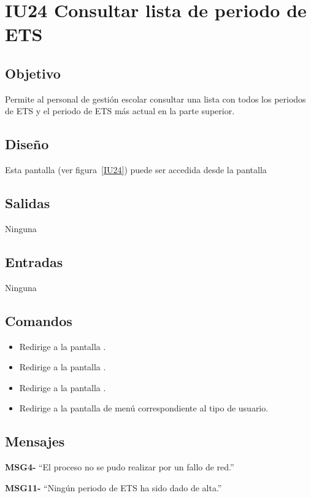 
\section{IU24 Consultar lista de periodo de ETS}
\subsection{Objetivo}
   Permite al personal de gestión escolar consultar una lista con todos los periodos de ETS y el periodo de ETS más actual en la parte superior.
\subsection{Diseño}
    Esta pantalla  (ver figura~\ref{IU24}) puede ser accedida desde la pantalla 

\subsection{Salidas}
Ninguna
\subsection{Entradas}
Ninguna
\subsection{Comandos}
\begin{itemize}
\item {} Redirige a la pantalla .
    \item {} Redirige a la pantalla .
    \item {} Redirige a la pantalla .
    \item {} Redirige a la pantalla de menú correspondiente al tipo de usuario.
    
\end{itemize}

\subsection{Mensajes}

\begin{Citemize}
    \item {\bf MSG4-}  ``El proceso no se pudo realizar por un fallo de red.''
    \item {\bf MSG11-}  ``Ningún periodo de ETS ha sido dado de alta.''
\end{Citemize}


